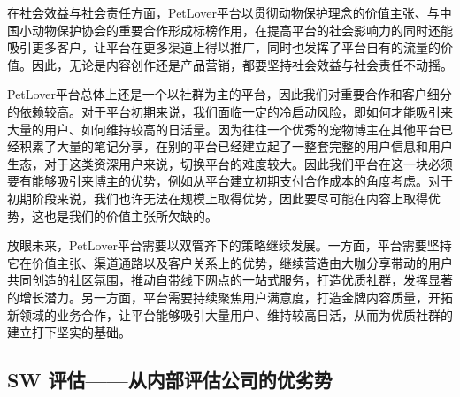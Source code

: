 \documentclass[a4paper]{ctexart}
\begin{document}
在社会效益与社会责任方面，PetLover平台以贯彻动物保护理念的价值主张、与中国小动物保护协会的重要合作形成标榜作用，在提高平台的社会影响力的同时还能吸引更多客户，让平台在更多渠道上得以推广，同时也发挥了平台自有的流量的价值。因此，无论是内容创作还是产品营销，都要坚持社会效益与社会责任不动摇。

PetLover平台总体上还是一个以社群为主的平台，因此我们对重要合作和客户细分的依赖较高。对于平台初期来说，我们面临一定的冷启动风险，即如何才能吸引来大量的用户、如何维持较高的日活量。因为往往一个优秀的宠物博主在其他平台已经积累了大量的笔记分享，在别的平台已经建立起了一整套完整的用户信息和用户生态，对于这类资深用户来说，切换平台的难度较大。因此我们平台在这一块必须要有能够吸引来博主的优势，例如从平台建立初期支付合作成本的角度考虑。对于初期阶段来说，我们也许无法在规模上取得优势，因此要尽可能在内容上取得优势，这也是我们的价值主张所欠缺的。 

放眼未来，PetLover平台需要以双管齐下的策略继续发展。一方面，平台需要坚持它在价值主张、渠道通路以及客户关系上的优势，继续营造由大咖分享带动的用户共同创造的社区氛围，推动自带线下网点的一站式服务，打造优质社群，发挥显著的增长潜力。另一方面，平台需要持续聚焦用户满意度，打造金牌内容质量，开拓新领域的业务合作，让平台能够吸引大量用户、维持较高日活，从而为优质社群的建立打下坚实的基础。

\subsection{SW 评估——从内部评估公司的优劣势}
\FloatBarrier
\end{document}
